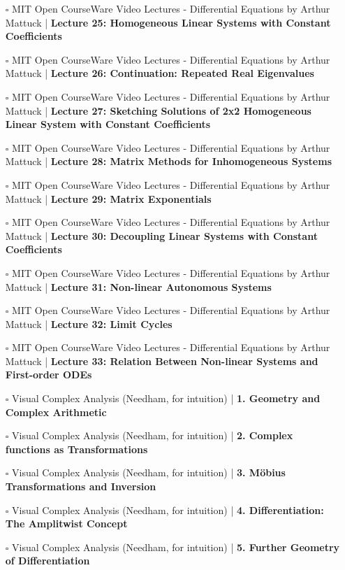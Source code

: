 \documentclass[a4, landscape, 12pt]{article}
\newcommand{\checkbox}{$\square$}%
\begin{document}
\begin{itemize}
{}
\item [\checkbox] MIT Open CourseWare Video Lectures - Differential Equations by Arthur Mattuck  | \textbf{Lecture 25: Homogeneous Linear Systems with Constant Coefficients
}
\item [\checkbox] MIT Open CourseWare Video Lectures - Differential Equations by Arthur Mattuck  | \textbf{Lecture 26: Continuation: Repeated Real Eigenvalues
}
\item [\checkbox] MIT Open CourseWare Video Lectures - Differential Equations by Arthur Mattuck  | \textbf{Lecture 27: Sketching Solutions of 2x2 Homogeneous Linear System with Constant Coefficients
}
\item [\checkbox] MIT Open CourseWare Video Lectures - Differential Equations by Arthur Mattuck  | \textbf{Lecture 28: Matrix Methods for Inhomogeneous Systems
}
\item [\checkbox] MIT Open CourseWare Video Lectures - Differential Equations by Arthur Mattuck  | \textbf{Lecture 29: Matrix Exponentials
}
\item [\checkbox] MIT Open CourseWare Video Lectures - Differential Equations by Arthur Mattuck  | \textbf{Lecture 30: Decoupling Linear Systems with Constant Coefficients
}
\item [\checkbox] MIT Open CourseWare Video Lectures - Differential Equations by Arthur Mattuck  | \textbf{Lecture 31: Non-linear Autonomous Systems
}
\item [\checkbox] MIT Open CourseWare Video Lectures - Differential Equations by Arthur Mattuck  | \textbf{Lecture 32: Limit Cycles
}
\item [\checkbox] MIT Open CourseWare Video Lectures - Differential Equations by Arthur Mattuck  | \textbf{Lecture 33: Relation Between Non-linear Systems and First-order ODEs
}
\item [\checkbox] Visual Complex Analysis (Needham, for intuition)  | \textbf{1. Geometry and Complex Arithmetic
}
\item [\checkbox] Visual Complex Analysis (Needham, for intuition)  | \textbf{2. Complex functions as Transformations
}
\item [\checkbox] Visual Complex Analysis (Needham, for intuition)  | \textbf{3. Möbius Transformations and Inversion
}
\item [\checkbox] Visual Complex Analysis (Needham, for intuition)  | \textbf{4. Differentiation: The Amplitwist Concept
}
\item [\checkbox] Visual Complex Analysis (Needham, for intuition)  | \textbf{5. Further Geometry of Differentiation
}
\end{itemize}
\end{document}
